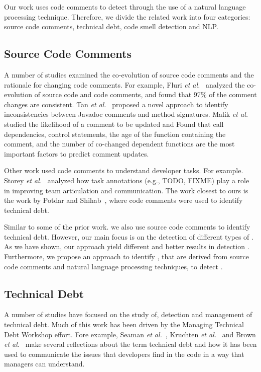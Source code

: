 Our work uses code comments to detect \SATD through the use of a natural language processing technique. Therefore, we divide the related work into four categories: source code comments, technical debt, code smell detection and NLP.

\subsection{Source Code Comments}

A number of studies examined the co-evolution of source code comments and the rationale for changing code comments. For example, Fluri \textit{et al.}~\cite{Fluri2007WCRE} analyzed the co-evolution of source code and code comments, and found that 97\% of the comment changes are consistent. Tan \textit{et al.}~\cite{Tan2012ICST} proposed a novel approach to identify inconsistencies between Javadoc comments and method signatures. Malik \textit{et al.} \cite{Malik2008ICSM} studied the likelihood of a comment to be updated and Found that   call dependencies, control statements, the age of the function containing the comment, and the number of co-changed dependent functions are the most important factors to predict comment updates.

Other work used code comments to understand developer tasks. For example. Storey \textit{et al.}~\cite{Storey2008ICSE} analyzed how task annotations (e.g., TODO, FIXME) play a role in improving team articulation and communication. The work closest to ours is the work by Potdar and Shihab~\cite{Potdar2014ICSME}, where code comments were used to identify technical debt. 

Similar to some of the prior work. we also use source code comments to identify technical debt. However, our main focus is on the detection of different types of \SATD. As we have shown, our approach yield different and better results in detection \SATD. Furthermore, we propose an approach to identify \SATD, that are derived from source code comments and natural language processing techniques, to detect \SATD.

\subsection{Technical Debt}

A number of studies have focused on the study of, detection and management of technical debt. Much of this work has been driven by the Managing Technical Debt Workshop effort. Fore example, Seaman \textit{et al.}~\cite{Seaman2011}, Kruchten \textit{et al.}~\cite{Kruchten2013IWMTD} and Brown \textit{et al.}~\cite{Brown2010MTD} make several reflections about the term technical debt and how it has been used to communicate the issues that developers find in the code in a way that managers can understand. 

